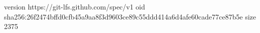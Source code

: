 version https://git-lfs.github.com/spec/v1
oid sha256:26f2474bffd0cfb45a9aa8f3d9603ce89c55ddd414a6d4afe60cade77ce87b5e
size 2375
